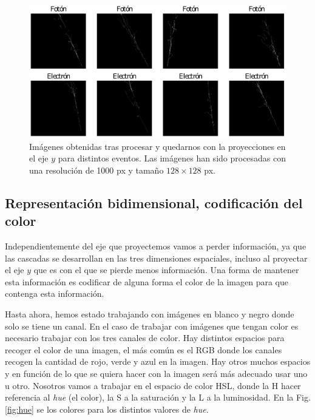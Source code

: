 \documentclass[a4paper,12pt,oneside,titlepage]{book}
\begin{document}
\begin{figure}[h!]
  \centering
  \includegraphics[scale=0.75, center]{varias_proyecciones.pdf}
  \caption{Imágenes obtenidas tras procesar y quedarnos con la proyecciones en el eje $y$ para distintos eventos. Las imágenes han sido procesadas con una resolución de 1000 px y tamaño $128\times128$ px.}
  \label{fig:muchas_proyecciones}
\end{figure}

\subsection*{Representación bidimensional, codificación del color}

Independientemente del eje que proyectemos vamos a perder información, ya que las cascadas se desarrollan en las tres dimensiones espaciales, incluso al proyectar el eje $y$ que es con el que se pierde menos información. Una forma de mantener esta información es codificar de alguna forma el color de la imagen para que contenga esta información.

Hasta ahora, hemos estado trabajando con imágenes en blanco y negro donde solo se tiene un canal. En el caso de trabajar con imágenes que tengan color es necesario trabajar con los tres canales de color. Hay distintos espacios para recoger el color de una imagen, el más común es el RGB donde los canales recogen la cantidad de rojo, verde y azul en la imagen. Hay otros muchos espacios y en función de lo que se quiera hacer con la imagen será más adecuado usar uno u otro. Nosotros vamos a trabajar en el espacio de color HSL, donde la H hacer referencia al \textit{hue} (el color), la S a la saturación y la L a la luminosidad. En la Fig. \ref{fig:hue} se los colores para los distintos valores de \textit{hue}.
\end{document}
